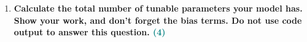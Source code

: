 \documentclass[a4paper]{article}
\begin{document}
\begin{sloppypar}
\begin{enumerate}[start=4,label=Q\arabic*,left=0pt]
\begin{enumerate}
    \end{enumerate}

    \par 

    \item \textbf{Calculate the total number of tunable parameters your model has. Show your work,
    and don’t forget the bias terms. Do not use code output to answer this question. \hfill \textcolor{teal}{(4)}}

    \par 

\end{enumerate}
\end{sloppypar}



\end{document}
